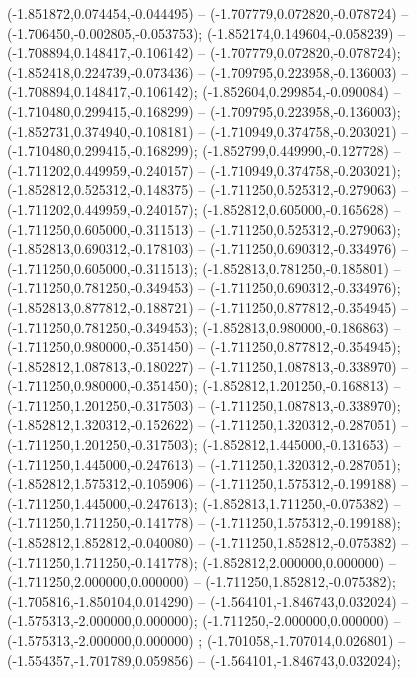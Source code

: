  (-1.851872,0.074454,-0.044495) -- (-1.707779,0.072820,-0.078724) -- (-1.706450,-0.002805,-0.053753);
 (-1.852174,0.149604,-0.058239) -- (-1.708894,0.148417,-0.106142) -- (-1.707779,0.072820,-0.078724);
 (-1.852418,0.224739,-0.073436) -- (-1.709795,0.223958,-0.136003) -- (-1.708894,0.148417,-0.106142);
 (-1.852604,0.299854,-0.090084) -- (-1.710480,0.299415,-0.168299) -- (-1.709795,0.223958,-0.136003);
 (-1.852731,0.374940,-0.108181) -- (-1.710949,0.374758,-0.203021) -- (-1.710480,0.299415,-0.168299);
 (-1.852799,0.449990,-0.127728) -- (-1.711202,0.449959,-0.240157) -- (-1.710949,0.374758,-0.203021);
 (-1.852812,0.525312,-0.148375) -- (-1.711250,0.525312,-0.279063) -- (-1.711202,0.449959,-0.240157);
 (-1.852812,0.605000,-0.165628) -- (-1.711250,0.605000,-0.311513) -- (-1.711250,0.525312,-0.279063);
 (-1.852813,0.690312,-0.178103) -- (-1.711250,0.690312,-0.334976) -- (-1.711250,0.605000,-0.311513);
 (-1.852813,0.781250,-0.185801) -- (-1.711250,0.781250,-0.349453) -- (-1.711250,0.690312,-0.334976);
 (-1.852813,0.877812,-0.188721) -- (-1.711250,0.877812,-0.354945) -- (-1.711250,0.781250,-0.349453);
 (-1.852813,0.980000,-0.186863) -- (-1.711250,0.980000,-0.351450) -- (-1.711250,0.877812,-0.354945);
 (-1.852812,1.087813,-0.180227) -- (-1.711250,1.087813,-0.338970) -- (-1.711250,0.980000,-0.351450);
 (-1.852812,1.201250,-0.168813) -- (-1.711250,1.201250,-0.317503) -- (-1.711250,1.087813,-0.338970);
 (-1.852812,1.320312,-0.152622) -- (-1.711250,1.320312,-0.287051) -- (-1.711250,1.201250,-0.317503);
 (-1.852812,1.445000,-0.131653) -- (-1.711250,1.445000,-0.247613) -- (-1.711250,1.320312,-0.287051);
 (-1.852812,1.575312,-0.105906) -- (-1.711250,1.575312,-0.199188) -- (-1.711250,1.445000,-0.247613);
 (-1.852813,1.711250,-0.075382) -- (-1.711250,1.711250,-0.141778) -- (-1.711250,1.575312,-0.199188);
 (-1.852812,1.852812,-0.040080) -- (-1.711250,1.852812,-0.075382) -- (-1.711250,1.711250,-0.141778);
 (-1.852812,2.000000,0.000000) -- (-1.711250,2.000000,0.000000) -- (-1.711250,1.852812,-0.075382);
 (-1.705816,-1.850104,0.014290) -- (-1.564101,-1.846743,0.032024) -- (-1.575313,-2.000000,0.000000);
 (-1.711250,-2.000000,0.000000) -- (-1.575313,-2.000000,0.000000) ;
 (-1.701058,-1.707014,0.026801) -- (-1.554357,-1.701789,0.059856) -- (-1.564101,-1.846743,0.032024);
